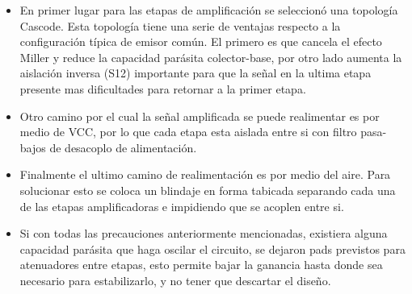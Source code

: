 \documentclass[11pt,a4paper,twoside]{report}
\begin{document}
	\begin{itemize}
			\item En primer lugar para las etapas de amplificación se seleccionó una topología Cascode. Esta topología tiene una serie de ventajas respecto a la configuración típica de emisor común. El primero es que cancela el efecto Miller y reduce la capacidad parásita colector-base, por otro lado aumenta la aislación inversa (S12) importante para que la señal en la ultima etapa presente mas dificultades para retornar a la primer etapa.
			
			\item Otro camino por el cual la señal amplificada se puede realimentar es por medio de VCC, por lo que cada etapa esta aislada entre si con filtro pasa-bajos de desacoplo de alimentación.
			
			\item Finalmente el ultimo camino de realimentación es por medio del aire. Para solucionar esto se coloca un blindaje en forma tabicada separando cada una de las etapas amplificadoras e impidiendo que se acoplen entre si.
			
			\item Si con todas las precauciones anteriormente mencionadas, existiera alguna capacidad parásita que haga oscilar el circuito, se dejaron pads previstos para atenuadores entre etapas, esto permite bajar la ganancia hasta donde sea necesario para estabilizarlo, y no tener que descartar el diseño.
	\end{itemize}
	
\end{document}
